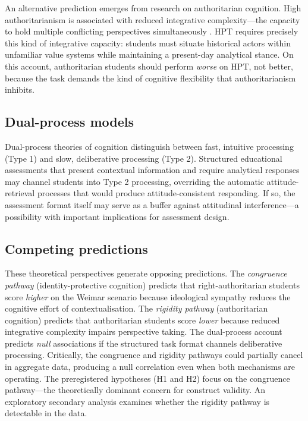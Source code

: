 \documentclass[pdflatex,sn-apa]{sn-jnl}%
\begin{document}
An alternative prediction emerges from research on authoritarian cognition. High authoritarianism is associated with reduced integrative complexity---the capacity to hold multiple conflicting perspectives simultaneously \citep{Suedfeld1977, Duckitt2001}. HPT requires precisely this kind of integrative capacity: students must situate historical actors within unfamiliar value systems while maintaining a present-day analytical stance. On this account, authoritarian students should perform \emph{worse} on HPT, not better, because the task demands the kind of cognitive flexibility that authoritarianism inhibits.

\subsection{Dual-process models}\label{subsec:dual}

Dual-process theories of cognition \citep{Evans2013} distinguish between fast, intuitive processing (Type 1) and slow, deliberative processing (Type 2). Structured educational assessments that present contextual information and require analytical responses may channel students into Type 2 processing, overriding the automatic attitude-retrieval processes that would produce attitude-consistent responding. If so, the assessment format itself may serve as a buffer against attitudinal interference---a possibility with important implications for assessment design.

\subsection{Competing predictions}\label{subsec:predictions}

These theoretical perspectives generate opposing predictions. The \emph{congruence pathway} (identity-protective cognition) predicts that right-authoritarian students score \emph{higher} on the Weimar scenario because ideological sympathy reduces the cognitive effort of contextualisation. The \emph{rigidity pathway} (authoritarian cognition) predicts that authoritarian students score \emph{lower} because reduced integrative complexity impairs perspective taking. The dual-process account predicts \emph{null} associations if the structured task format channels deliberative processing. Critically, the congruence and rigidity pathways could partially cancel in aggregate data, producing a null correlation even when both mechanisms are operating. The preregistered hypotheses (H1 and H2) focus on the congruence pathway---the theoretically dominant concern for construct validity. An exploratory secondary analysis examines whether the rigidity pathway is detectable in the data.
\end{document}
